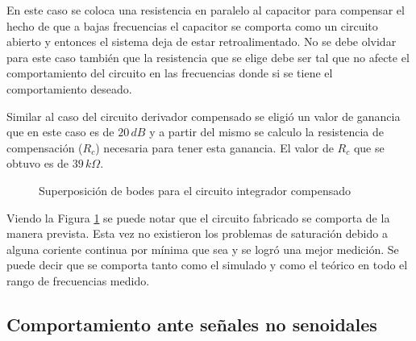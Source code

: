 \documentclass[11pt, a4paper]{article}
\begin{document}
En este caso se coloca una resistencia en paralelo al capacitor para compensar el hecho de que a bajas frecuencias el capacitor se comporta como un circuito abierto y entonces el sistema deja de estar retroalimentado. No se debe olvidar para este caso también que la resistencia que se elige debe ser tal que no afecte el comportamiento del circuito en las frecuencias donde si se tiene el comportamiento deseado.

Similar al caso del circuito derivador compensado se eligió un valor de ganancia que en este caso es de $20 \, dB$ y a partir del mismo se calculo la resistencia de compensación ($R_c$) necesaria para tener esta ganancia. El valor de $R_c$ que se obtuvo es de $39 \,k \Omega$.

\begin{figure}[H]
	\begin{center}
		\caption{Superposición de bodes para el circuito integrador compensado}
		\label{fig:superposicion3casosintegradorCOMPENSADO}
	\end{center}
\end{figure}

Viendo la Figura \ref{fig:superposicion3casosintegradorCOMPENSADO} se puede notar que el circuito fabricado se comporta de la manera prevista. Esta vez no existieron los problemas de saturación debido a alguna coriente continua por mínima que sea y se logró una mejor medición. Se puede decir que se comporta tanto como el simulado y como el teórico en todo el rango de frecuencias medido.

\subsection{Comportamiento ante señales no senoidales}
\end{document}
